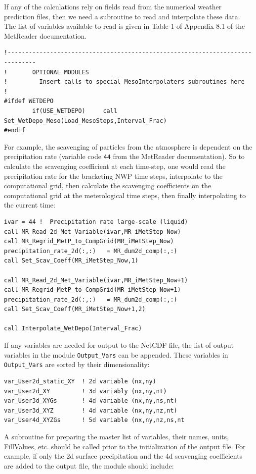 If any of the calculations rely on fields read from the numerical weather
prediction files, then we need a subroutine to read and interpolate these
data.  The list of variables available to read is given in Table 1 of Appendix 8.1
of the MetReader documentation.
\small
\begin{verbatim}
!------------------------------------------------------------------------------
!       OPTIONAL MODULES
!         Insert calls to special MesoInterpolaters subroutines here
!
#ifdef WETDEPO
        if(USE_WETDEPO)     call Set_WetDepo_Meso(Load_MesoSteps,Interval_Frac)
#endif
\end{verbatim}
\normalsize
For example, the scavenging of particles from the atmosphere is dependent on
the precipitation rate (variable code \texttt{44} from the MetReader documentation).
So to calculate the scavenging coefficient at each time-step, one would read the
precipitation rate for the bracketing NWP time steps, interpolate to the computational
grid, then calculate the scavenging coefficients on the computational grid at the
meterological time steps, then finally interpolating to the current time:
\small
\begin{verbatim}
ivar = 44 !  Precipitation rate large-scale (liquid)
call MR_Read_2d_Met_Variable(ivar,MR_iMetStep_Now)
call MR_Regrid_MetP_to_CompGrid(MR_iMetStep_Now)
precipitation_rate_2d(:,:)   = MR_dum2d_comp(:,:)
call Set_Scav_Coeff(MR_iMetStep_Now,1)

call MR_Read_2d_Met_Variable(ivar,MR_iMetStep_Now+1)
call MR_Regrid_MetP_to_CompGrid(MR_iMetStep_Now+1)
precipitation_rate_2d(:,:)   = MR_dum2d_comp(:,:)
call Set_Scav_Coeff(MR_iMetStep_Now+1,2)

call Interpolate_WetDepo(Interval_Frac)
\end{verbatim}
\normalsize
If any variables are needed for output to the NetCDF file, the list of output
variables in the module \texttt{Output\_Vars} can be appended.  These variables
in \texttt{Output\_Vars} are sorted by their dimensionality:
\small
\begin{verbatim}
var_User2d_static_XY  ! 2d variable (nx,ny)
var_User2d_XY         ! 3d variably (nx,ny,nt)
var_User3d_XYGs       ! 4d variable (nx,ny,ns,nt)
var_User3d_XYZ        ! 4d variable (nx,ny,nz,nt)
var_User4d_XYZGs      ! 5d variable (nx,ny,nz,ns,nt
\end{verbatim}
\normalsize
A subroutine for preparing the master list of variables, their names, units,
FillValues, etc. should be called prior to the initialization of the output file.
For example, if only the 2d surface precipitation and the 4d scavenging coefficients
are added to the output file, the module should include:

